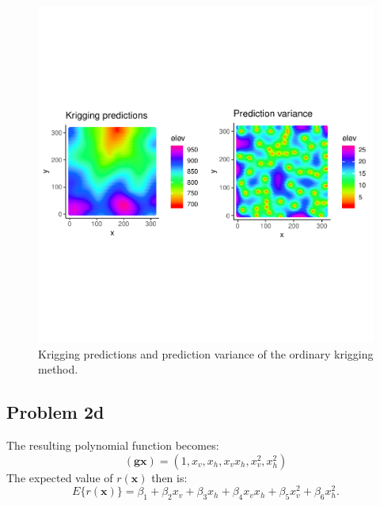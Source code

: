 \documentclass[]{article}
\newcommand{\vect}[1]{\ensuremath{\boldsymbol{\mathbf{#1}}}}
\begin{document}
\begin{figure}
\centering
\includegraphics{Exercise-1_files/figure-latex/fig3-1.pdf}
\caption{\label{fig:fig3} Krigging predictions and prediction variance
of the ordinary krigging method.}
\end{figure}

\hypertarget{problem-2d}{%
\subsection{Problem 2d}\label{problem-2d}}

The resulting polynomial function becomes: \[
\vect{(gx)} = (1, x_v, x_h, x_vx_h, x_v^2, x_h^2)
\] The expected value of \(r(\vect{x})\) then is: \[
E \{r(\vect{x}) \} = \beta_1 + \beta_2x_v + \beta_3x_h + \beta_4x_vx_h + \beta_5x_v^2 + \beta_6x_h^2 .
\]
\end{document}
